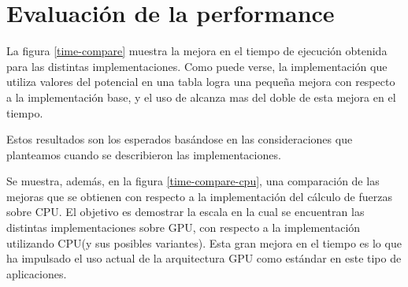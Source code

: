 


\section{Evaluación de la performance}



La figura \ref{time-compare} muestra la mejora en el tiempo de ejecución obtenida para las distintas implementaciones.
Como puede verse, la implementación que utiliza valores del potencial en una tabla logra una pequeña mejora con respecto a la implementación base, y el uso de alcanza mas del doble de esta mejora en el tiempo.

Estos resultados son los esperados basándose en las consideraciones que planteamos cuando se describieron las implementaciones. 

Se muestra, además, en la figura \ref{time-compare-cpu}, una comparación de las mejoras que se obtienen con respecto a la implementación del cálculo de fuerzas sobre CPU. 
El objetivo es demostrar la escala en la cual se encuentran las distintas implementaciones sobre GPU, con respecto a la implementación utilizando CPU(y sus posibles variantes). 
Esta gran mejora en el tiempo es lo que ha impulsado el uso actual de la arquitectura GPU como estándar en este tipo de aplicaciones.




